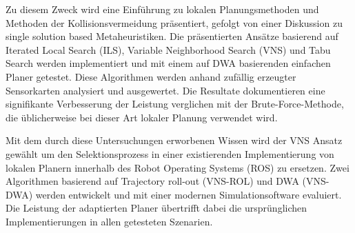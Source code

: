 Zu diesem Zweck wird eine Einf\"uhrung zu lokalen Planungsmethoden und Methoden der Kollisionsvermeidung pr\"asentiert, gefolgt von einer Diskussion zu \glqq single solution based \grqq{} Metaheuristiken. 
Die pr\"asentierten Ans\"atze basierend auf Iterated Local Search (ILS), Variable Neighborhood Search (VNS) und Tabu Search werden implementiert und mit einem auf DWA basierenden einfachen Planer getestet. 
Diese Algorithmen werden anhand zuf\"allig erzeugter Sensorkarten analysiert und ausgewertet. 
Die Resultate dokumentieren eine signifikante Verbesserung der Leistung verglichen mit der Brute-Force-Methode, die \"ublicherweise bei dieser Art lokaler Planung verwendet wird.

Mit dem durch diese Untersuchungen erworbenen Wissen wird der VNS Ansatz gew\"ahlt um den Selektionsprozess in einer existierenden Implementierung von lokalen Planern innerhalb des Robot Operating Systems (ROS) zu ersetzen. 
Zwei Algorithmen basierend auf Trajectory roll-out (VNS-ROL) und DWA (VNS-DWA) werden entwickelt und mit einer modernen Simulationsoftware evaluiert. 
Die Leistung der adaptierten Planer \"ubertrifft dabei die urspr\"unglichen Implementierungen in allen getesteten Szenarien. 

\endgroup			

\vfill